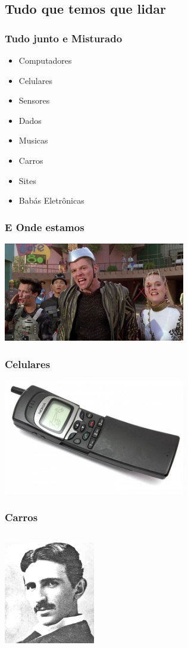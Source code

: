 \documentclass{beamer}
\begin{document}
\subsection{Tudo que temos que lidar}

\begin{frame} \frametitle{Tudo junto e Misturado}
 \begin{itemize}
  \item Computadores
  \item Celulares
  \item Sensores
  \item Dados
  \item Musicas
  \item Carros
  \item Sites
  \item Babás Eletrônicas
 \end{itemize}
\end{frame}

\begin{frame} \frametitle{ E Onde estamos }
    \includegraphics[width=300px]{images/2015}
\end{frame}

\begin{frame} \frametitle{ Celulares }
    \includegraphics[width=300px]{images/matrix}
\end{frame}

\begin{frame} \frametitle{ Carros }
    \begin{columns}
        \includegraphics[width=150px]{images/nikola-tesla}
     \end{columns}
\end{frame}
\end{document}
